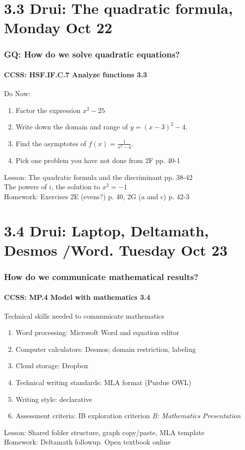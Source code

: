 \documentclass{beamer}
\begin{document}
\section{3.3 Drui: The quadratic formula, Monday Oct 22}
  \frame
  {
    \frametitle{GQ: How do we solve quadratic equations?}
    \framesubtitle{CCSS: HSF.IF.C.7 Analyze functions    \alert{3.3}}

    \begin{block}{Do Now: }
      \begin{enumerate}
          \item Factor the expression $x^2-25$
          \item Write down the domain and range of $y=(x-3)^2-4$.
          \item Find the asymptotes of $\displaystyle f(x)=\frac{1}{x^2-4}$.
          \item Pick one problem you have not done from 2F pp. 40-1
      \end{enumerate}
    \end{block}
    Lesson: The quadratic formula and the discriminant pp. 38-42 \\
    The powers of $i$, the solution to $x^2=-1$\\ \bigskip
    Homework: Exercises 2E (evens?) p. 40, 2G (a and c) p. 42-3
  }

\section{3.4 Drui: Laptop, Deltamath, Desmos /Word. Tuesday Oct 23}
  \frame
  {
    \frametitle{How do we communicate mathematical results?}
    \framesubtitle{CCSS: MP.4 Model with mathematics  \alert{3.4}}

    \begin{block}{Technical skills needed to communicate mathematics}
    \begin{enumerate}
        \item Word processing: Microsoft Word and equation editor
        \item Computer calculators: Desmos; domain restriction, labeling
        \item Cloud storage: Dropbox
        \item Technical writing standards: MLA format (Purdue OWL)
        \item Writing style: declarative
        \item Assessment criteria: IB exploration criterion \emph{B: Mathematics Presentation}
    \end{enumerate}
    \end{block}
    Lesson: Shared folder structure, graph copy/paste, MLA template\\ \bigskip
    Homework: Deltamath followup. Open textbook online
  }
\end{document}
